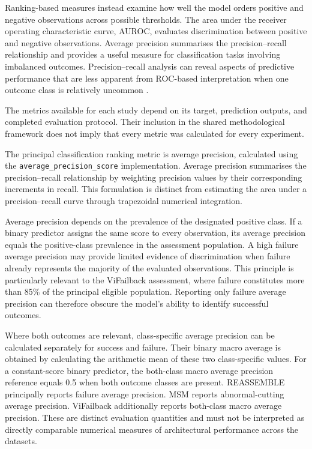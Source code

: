 Ranking-based measures instead examine how well the model orders positive and negative observations across possible thresholds. The area under the receiver operating characteristic curve, AUROC, evaluates discrimination between positive and negative observations. Average precision summarises the precision–recall relationship and provides a useful measure for classification tasks involving imbalanced outcomes. Precision–recall analysis can reveal aspects of predictive performance that are less apparent from ROC-based interpretation when one outcome class is relatively uncommon \parencite{Saito2015PrecisionRecall}.

The metrics available for each study depend on its target, prediction outputs, and completed evaluation protocol. Their inclusion in the shared methodological framework does not imply that every metric was calculated for every experiment.

The principal classification ranking metric is average precision, calculated using the \texttt{average\_precision\_score} implementation. Average precision summarises the precision–recall relationship by weighting precision values by their corresponding increments in recall. This formulation is distinct from estimating the area under a precision–recall curve through trapezoidal numerical integration.

Average precision depends on the prevalence of the designated positive class. If a binary predictor assigns the same score to every observation, its average precision equals the positive-class prevalence in the assessment population. A high failure average precision may provide limited evidence of discrimination when failure already represents the majority of the evaluated observations. This principle is particularly relevant to the ViFailback assessment, where failure constitutes more than 85\% of the principal eligible population. Reporting only failure average precision can therefore obscure the model’s ability to identify successful outcomes.

Where both outcomes are relevant, class-specific average precision can be calculated separately for success and failure. Their binary macro average is obtained by calculating the arithmetic mean of these two class-specific values. For a constant-score binary predictor, the both-class macro average precision reference equals 0.5 when both outcome classes are present. REASSEMBLE principally reports failure average precision. MSM reports abnormal-cutting average precision. ViFailback additionally reports both-class macro average precision. These are distinct evaluation quantities and must not be interpreted as directly comparable numerical measures of architectural performance across the datasets.

